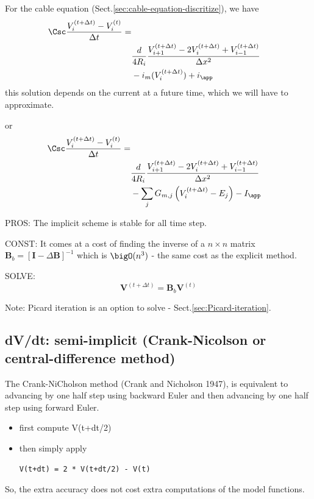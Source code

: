 For the cable equation (Sect.\ref{sec:cable-equation-discritize}), we have
\begin{equation}
\begin{split}
  \Csc \frac{V_i^{(t+\Delta t)} - V_i^{(t)}}{\Delta t} = \\
  & \frac{d}{4R_i}
  \frac{V_{i+1}^{(t + \Delta t)} - 2V_i^{(t + \Delta t)} + V_{i-1}^{(t + \Delta
  t)}}{\Delta x^2} \\
  & - i_m (V_i^{(t+\Delta t)}) + i_\app
\end{split}
\end{equation}
 this solution depends on the current at a future time, which we will have to
approximate. 

or
\begin{equation}
\begin{split}
  \Csc \frac{V_i^{(t+\Delta t)} - V_i^{(t)}}{\Delta t} = \\
  & \frac{d}{4R_i}
  \frac{V_{i+1}^{(t + \Delta t)} - 2V_i^{(t + \Delta t)} + V_{i-1}^{(t + \Delta
  t)}}{\Delta x^2} \\
  &- \sum_j G_{m,j} \left( V_{i}^{(t + \Delta t)} - E_j
  \right)    - I_\app
\end{split}
\end{equation}

PROS: The implicit scheme is stable for all time step.

CONST: It comes at a cost of finding the inverse of a $n\times n$ matrix 
$\mathbf{B}_b = \left[ \mathbf{I} - \Delta \mathbf{B} \right]^{-1}$ which is
$\bigO(n^3)$ - the same cost as the explicit method.

SOLVE:
\begin{equation}
\mathbf{V}^{(t + \Delta t)} = \mathbf{B}_b \mathbf{V}^{(t)}
\end{equation}

Note: Picard iteration is an option to solve - Sect.\ref{sec:Picard-iteration}.

\subsection{dV/dt: semi-implicit (Crank-Nicolson or central-difference method)}
\label{sec:Crank-Nicolson-method}

The Crank-NiCholson method (Crank and Nicholson 1947), is
equivalent to advancing by one half step using backward Euler and then advancing
by one half step using forward Euler.
\begin{itemize}
  \item first compute V(t+dt/2)
  \item then simply apply
  
\begin{verbatim}
V(t+dt) = 2 * V(t+dt/2) - V(t)
\end{verbatim}
\end{itemize}
So, the extra accuracy does not cost extra computations
of the model functions.

